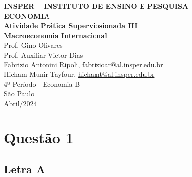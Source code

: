 \documentclass[a4paper,12pt]{article}[abntex2]
\begin{document}
\begin{titlepage}
    \centering
    \vspace*{1cm}
    \Large\textbf{INSPER – INSTITUTO DE ENSINO E PESQUISA}\\
    \Large \textbf{ECONOMIA}\\
    \vspace{1.5cm}
    \Large\textbf{Atividade Prática Superviosionada III}\\
    \textbf{Macroeconomia Internacional}\\
    \vspace{1.5cm}
    Prof. Gino Olivares\\
    Prof. Auxiliar Victor Dias \\
    \vfill
    \normalsize
    Fabrizio Antonini Ripoli, \href{mailto:fabrizioar@al.insper.edu.br}{fabrizioar@al.insper.edu.br}\\
    Hicham Munir Tayfour, \href{mailto:hichamt@al.insper.edu.br}{hichamt@al.insper.edu.br}\\
    4º Período - Economia B\\
    \vfill
    São Paulo\\
    Abril/2024
\end{titlepage}

\newpage
\tableofcontents
\thispagestyle{empty} %
\newpage
\setcounter{page}{1} %
\justify
\onehalfspacing

\pagestyle{fancy}
\fancyhf{}
\rhead{\thepage}

\section{\textbf{Questão 1}}
\subsection{\textbf{Letra A}}
\end{document}
